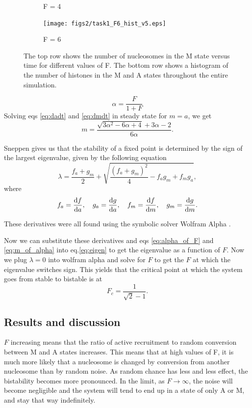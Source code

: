 \documentclass[fleqn,10pt]{SelfArx} %
\begin{document}
\begin{figure}[ht]
\begin{subfigure}[b]{.3\textwidth}
		\caption{F = 4}
		\label{fig:task1_F4_hist}
	\end{subfigure}
	\begin{subfigure}[b]{.3\textwidth}
		\centering
		\texttt{[image: figs2/task1\_F6\_hist\_v5.eps]}
		\caption{F = 6}
		\label{fig:task1_F6_hist}
	\end{subfigure}
		\caption{The top row shows the number of nucleosomes in the M state versus time for different values of F. The bottom row shows a histogram of the number of histones in the M and A states throughout the entire simulation. }
		\label{fig:task1}
\end{figure}

\begin{equation}
	\alpha = \frac{F}{1 + F}
	\label{eq:alpha_of_F}
\end{equation}
Solving eqs \eqref{eq:dadt} and \eqref{eq:dmdt} in steady state for $m=a$, we get 
\begin{equation}
	m = \frac{\sqrt{3\alpha^2 - 6\alpha + 4} + 3\alpha - 2}{6\alpha}.
	\label{eq:m_of_alpha}
\end{equation}


Sneppen \cite{book} gives us that the stability of a fixed point is determined by the sign of the largest eigenvalue, given by the following equation
\begin{equation}
	\lambda = \frac{f_a + g_m}{2}  + \sqrt{\frac{\left(f_a + g_m\right)^2}{4} - f_ag_m + f_mg_a},
	\label{eq:eigen}
\end{equation}
where
\begin{equation}
	f_a = \dv{f}{a},\quad
	g_a = \dv{g}{a},\quad
	f_m = \dv{f}{m},\quad
	g_m = \dv{g}{m}.
\end{equation}

These derivatives were all found using the symbolic solver Wolfram Alpha \cite{wolfram}. 

Now we can substitute these derivatives and eqs \eqref{eq:alpha_of_F} and \eqref{eq:m_of_alpha} into eq.\eqref{eq:eigen} to get the eigenvalue as a function of $F$. Now we plug $\lambda = 0$ into wolfram alpha \cite{wolfram} and solve for $F$ to get the $F$ at which the eigenvalue switches sign. This yields that the critical point at which the system goes from stable to bistable is at
\begin{equation}
	F_c = \frac{1}{\sqrt{2} - 1}.
\end{equation}


\subsection{Results and discussion}
$F$ increasing means that the ratio of active recruitment to random conversion between M and A states increases. This means that at high values of F, it is much more likely that a nucleosome is changed by conversion from another nucleosome than by random noise. As random chance has less and less effect, the bistability becomes more pronounced. In the limit, as $F\to\infty$, the noise will become negligible and the system will tend to end up in a state of only A or M, and stay that way indefinitely. 
\end{document}
